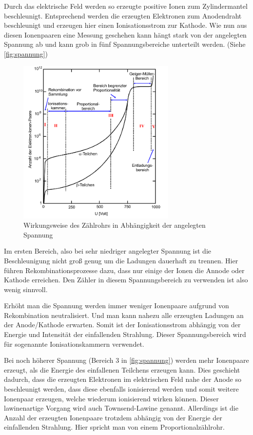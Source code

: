 Durch das elektrische Feld werden so erzeugte positive Ionen zum Zylindermantel beschleunigt.
Entsprechend werden die erzeugten Elektronen zum Anodendraht beschleunigt und erzeugen hier einen Ionisationsstrom zur Kathode.
Wie nun aus diesen Ionenpaaren eine Messung geschehen kann hängt stark von der angelegten Spannung ab und kann grob in fünf Spannungsbereiche unterteilt werden. (Siehe \autoref{fig:spannung})

\begin{figure}
    \centering
    \includegraphics[width=0.7\textwidth]{images/skizze_1.png}
    \caption{Wirkungsweise des Zählrohrs in Abhängigkeit der angelegten Spannung}
    \label{fig:spannung}
\end{figure}


Im ersten Bereich, also bei sehr niedriger angelegter Spannung ist die Beschleunigung nicht groß genug um die Ladungen dauerhaft zu trennen.
Hier führen Rekombinationsprozesse dazu, dass nur einige der Ionen die Annode oder Kathode erreichen.
Den Zähler in diesem Spannungsbereich zu verwenden ist also wenig sinnvoll.

Erhöht man die Spannung werden immer weniger Ionenpaare aufgrund von Rekombination neutralisiert.
Und man kann nahezu alle erzeugten Ladungen an der Anode/Kathode erwarten.
Somit ist der Ionisationsstrom abhängig von der Energie und Intensität der einfallenden Strahlung.
Dieser Spannungsbereich wird für sogenannte Ionisationskammern verwendet.

Bei noch höherer Spannung (Bereich 3 in \autoref{fig:spannung}) werden mehr Ionenpaare erzeugt, als die Energie des einfallenen Teilchens erzeugen kann.
Dies geschieht dadurch, dass die erzeugten Elektronen im elektrischen Feld nahe der Anode so beschleunigt werden, dass diese ebenfalls ionisierend werden und somit weitere Ionenpaar erzeugen, welche wiederum ionisierend wirken können.
Dieser lawinenartige Vorgang wird auch Townsend-Lawine genannt.
Allerdings ist die Anzahl der erzeugten Ionenpaare trotzdem abhängig von der Energie der einfallenden Strahlung.
Hier spricht man von einem Proportionalzählrohr.

